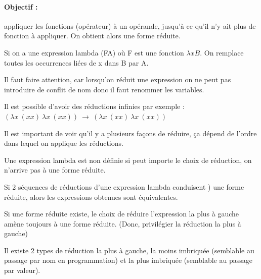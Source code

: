 \paragraph{Objectif :} appliquer les fonctions (opérateur) à un opérande, 
jusqu'à ce qu'il n'y ait plus de fonction à appliquer. On obtient alors une 
forme réduite.

\begin{mydef} Si on a une expression lambda (FA) où 
	F est une fonction $\lambda xB$. On remplace toutes les occurrences liées 
	de x dans B par A.
\end{mydef}

\begin{myrem}
	Il faut faire attention, car lorsqu'on réduit une expression on ne peut 
	pas introduire de conflit de nom donc il faut renommer les variables.
\end{myrem}

\begin{myrem}
	Il est possible d'avoir des réductions infinies par exemple : 
	$(\lambda x\ (xx)\ \lambda x \ (xx)) \ \rightarrow \ (\lambda x\ (xx) \  
\lambda x \ (xx))$
\end{myrem}

\begin{myrem}
	Il est important de voir qu'il y a plusieurs façons de réduire, ça 
	dépend de l'ordre dans lequel on applique les réductions.
\end{myrem}

\begin{myprop}
	Une expression lambda est non définie si peut importe le choix de 
	réduction, on n’arrive pas à une forme réduite.
\end{myprop}

\begin{mytheo} Si 2 séquences de réductions d'une expression 
	lambda conduisent ) une forme réduite, alors les expressions obtenues 
	sont équivalentes.
\end{mytheo}

\begin{myprop}
	Si une forme réduite existe, le choix de réduire l'expression la plus à 
	gauche amène toujours à une forme réduite. (Donc, privilégier la 
	réduction la plus à gauche)
\end{myprop}

\begin{myrem}
	Il existe 2 types de réduction la plus à gauche, la moins imbriquée 
	(semblable au passage par nom en programmation) et la plus imbriquée 
	(semblable au passage par valeur).
\end{myrem}


